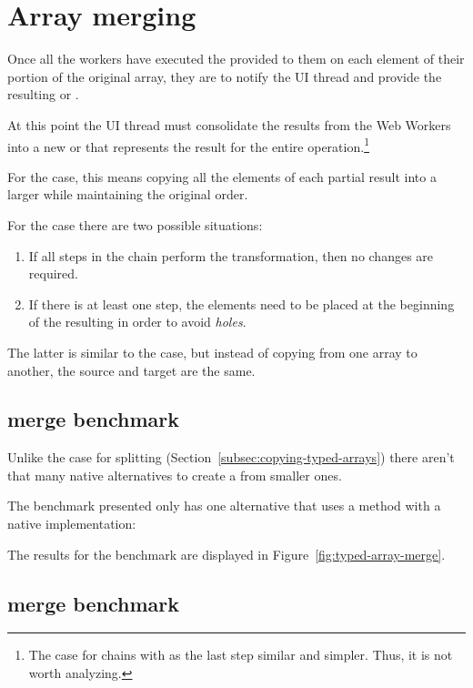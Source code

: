 \section{Array merging}

Once all the workers have executed the \tfunction{} provided to them on each element of their portion of the original array, they are to notify the UI thread and provide the resulting \tabuffer{} or \tsabuffer{}.

At this point the UI thread must consolidate the results from the Web Workers into a new \ttarray{} or \tstarray{} that represents the result for the entire operation.\footnote{The case for chains with  as the last step similar and simpler. Thus, it is not worth analyzing.}

For the \tabuffer{} case, this means copying all the elements of each partial result into a larger \ttarray{} while maintaining the original order.

For the \tsabuffer{} case there are two possible situations:
\begin{enumerate}
  \item If all steps in the chain perform the  transformation, then no changes are required.
  \item If there is at least one  step, the elements need to be placed at the beginning of the resulting \tstarray{} in order to avoid \textit{holes}.
\end{enumerate}

The latter is similar to the \tabuffer{} case, but instead of copying from one array to another, the source and target are the same.

\subsection{\ttarray{} merge benchmark}
Unlike the case for \ttarray{} splitting (Section~\ref{subsec:copying-typed-arrays}) there aren't that many native alternatives to create a \ttarray{} from smaller ones.

The benchmark presented only has one alternative that uses a method with a native implementation:

The results for the benchmark are displayed in Figure~\ref{fig:typed-array-merge}.

\subsection{\tstarray{} merge benchmark}

